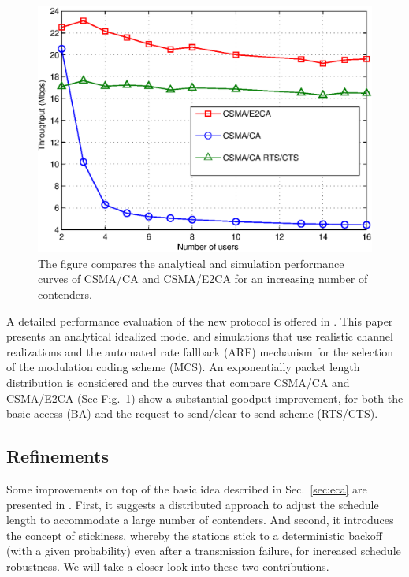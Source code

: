 \documentclass[journal]{IEEEtran}
\begin{document}
\begin{figure}[!t]
\centering
\includegraphics[width=\linewidth]{figures/performance}
\caption{The figure compares the analytical and simulation performance curves of CSMA/CA and CSMA/E2CA for an increasing number of contenders.}
\label{fig:performance}
\end{figure}

A detailed performance evaluation of the new protocol is offered in \cite{martorell2012pec}.
This paper presents an analytical idealized model and simulations that use realistic channel realizations and the automated rate fallback (ARF) mechanism for the selection of the modulation coding scheme (MCS).
An exponentially packet length distribution is considered and the curves that compare CSMA/CA and CSMA/E2CA (See Fig.~\ref{fig:performance}) show a substantial goodput improvement, for both the basic access (BA) and the request-to-send/clear-to-send scheme (RTS/CTS).

\subsection{Refinements}

Some improvements on top of the basic idea described in Sec.~\ref{sec:eca} are presented in \cite{fang2011dlm}. 
First, it suggests a distributed approach to adjust the schedule length to accommodate a large number of contenders.
And second, it introduces the concept of stickiness, whereby the stations stick to a deterministic backoff (with a given probability) even after a transmission failure, for increased schedule robustness. 
We will take a closer look into these two contributions.
\end{document}
